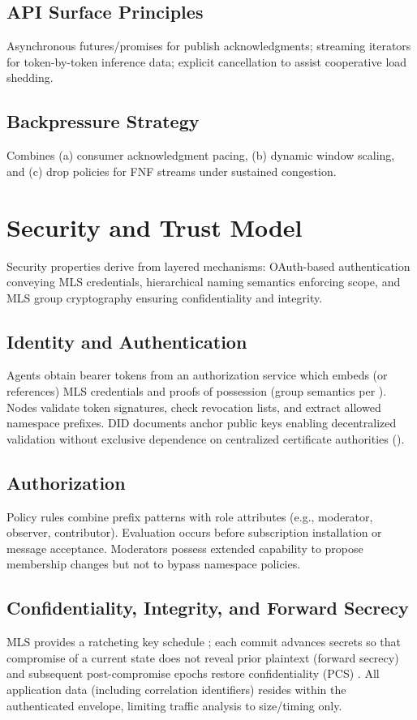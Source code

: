 \documentclass{article}
\theoremstyle{definition}
\theoremstyle{remark}
\begin{document}
\subsection{API Surface Principles}
Asynchronous futures/promises for publish acknowledgments; streaming iterators for token-by-token inference data; explicit cancellation to assist cooperative load shedding.
\subsection{Backpressure Strategy}
Combines (a) consumer acknowledgment pacing, (b) dynamic window scaling, and (c) drop policies for FNF streams under sustained congestion.

\section{Security and Trust Model}\label{sec:security}
Security properties derive from layered mechanisms: OAuth-based authentication conveying MLS credentials, hierarchical naming semantics enforcing scope, and MLS group cryptography ensuring confidentiality and integrity.
\subsection{Identity and Authentication}
Agents obtain bearer tokens from an authorization service which embeds (or references) MLS credentials and proofs of possession (group semantics per \citep{rfc9420}). Nodes validate token signatures, check revocation lists, and extract allowed namespace prefixes. DID documents anchor public keys enabling decentralized validation without exclusive dependence on centralized certificate authorities (\citep{didcore,didmethods}).
\subsection{Authorization}
Policy rules combine prefix patterns with role attributes (e.g., moderator, observer, contributor). Evaluation occurs before subscription installation or message acceptance. Moderators possess extended capability to propose membership changes but not to bypass namespace policies.
\subsection{Confidentiality, Integrity, and Forward Secrecy}
MLS provides a ratcheting key schedule \citep{rfc9420}; each commit advances secrets so that compromise of a current state does not reveal prior plaintext (forward secrecy) and subsequent post-compromise epochs restore confidentiality (PCS) \citep{rfc9750}. All application data (including correlation identifiers) resides within the authenticated envelope, limiting traffic analysis to size/timing only.
\end{document}
